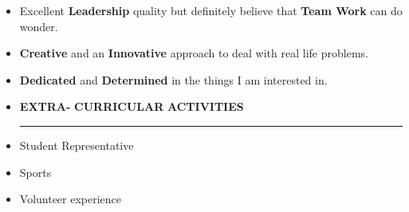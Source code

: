 \documentclass[a4paper]{article}
\begin{document}
 \renewcommand{\labelitemi}{\textbullet}
 \begin{itemize}
   \item Excellent \textbf{Leadership} quality but definitely believe that \textbf{Team Work} can do wonder.
   \item \textbf{Creative} and an \textbf{Innovative} approach to deal with real life problems.
   \item \textbf{Dedicated} and \textbf{Determined} in the things I am interested in.
 \end{itemize}
 \renewcommand{\labelitemi}{\texttt{[image: jnj.JPG]}}
\begin{itemize}
  \vspace{4ex}
  \item \textbf{\huge{E}}\textbf{\large XTRA-} \textbf{\huge{C}}\textbf{\large URRICULAR}
  \textbf{\huge{A}}\textbf{\large CTIVITIES}
  {\color{mypink1}
  \rule{6.5cm}{0.5mm}}
 \end{itemize}
 \renewcommand{\labelitemi}{\textbullet}
\begin{itemize}
  \item Student Representative
  \item Sports
  \item Volunteer experience
\end{itemize}
 
\end{document}
